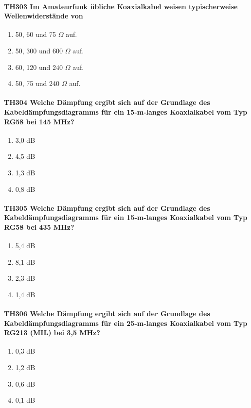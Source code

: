 \documentclass[8pt]{article}
\begin{document}
\paragraph*{TH303 Im Amateurfunk übliche Koaxialkabel weisen typischerweise Wellenwiderstände von} 
\begin{enumerate}[nolistsep,label=\Alph*]
\item 50, 60 und 75 $\Omega$ auf.
\item 50, 300 und 600 $\Omega$ auf.
\item 60, 120 und 240 $\Omega$ auf.
\item 50, 75 und 240 $\Omega$ auf.
\end{enumerate}

\paragraph*{TH304 Welche Dämpfung ergibt sich auf der Grundlage des Kabeldämpfungsdiagramms für ein 15-m-langes Koaxialkabel vom Typ RG58 bei 145 MHz?}
\begin{enumerate}[nolistsep,label=\Alph*]
\item 3,0 dB
\item 4,5 dB
\item 1,3 dB
\item 0,8 dB
\end{enumerate}

\paragraph*{TH305 Welche Dämpfung ergibt sich auf der Grundlage des Kabeldämpfungsdiagramms für ein 15-m-langes Koaxialkabel vom Typ RG58 bei 435 MHz?} 
\begin{enumerate}[nolistsep,label=\Alph*]
\item 5,4 dB
\item 8,1 dB
\item 2,3 dB
\item 1,4 dB
\end{enumerate}

\paragraph*{TH306 Welche Dämpfung ergibt sich auf der Grundlage des Kabeldämpfungsdiagramms für ein 25-m-langes Koaxialkabel vom Typ RG213 (MIL) bei 3,5 MHz?}
\begin{enumerate}[nolistsep,label=\Alph*]
\item 0,3 dB
\item 1,2 dB
\item 0,6 dB
\item 0,1 dB
\end{enumerate}
\end{document}
